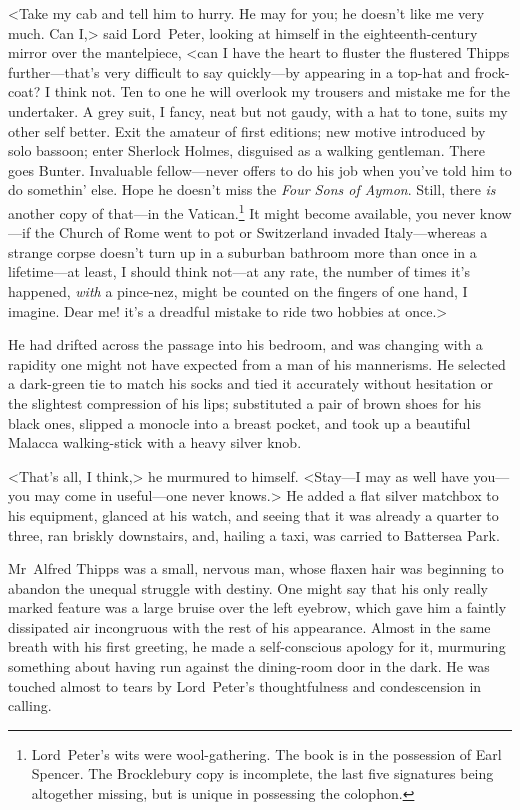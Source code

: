 <Take my cab and tell him to hurry. He may for you; he doesn't like me very much. Can I\@,> said Lord~Peter, looking at himself in the eighteenth-century mirror over the mantelpiece, <can I have the heart to fluster the flustered Thipps further—that's very difficult to say quickly—by appearing in a top-hat and frock-coat? I think not. Ten to one he will overlook my trousers and mistake me for the undertaker. A grey suit, I fancy, neat but not gaudy, with a hat to tone, suits my other self better. Exit the amateur of first editions; new motive introduced by solo bassoon; enter Sherlock Holmes, disguised as a walking gentleman. There goes Bunter. Invaluable fellow—never offers to do his job when you've told him to do somethin' else. Hope he doesn't miss the \textit{Four Sons of Aymon}. Still, there \textit{is} another copy of that—in the Vatican.\footnote{Lord~Peter's wits were wool-gathering. The book is in the possession of Earl Spencer. The Brocklebury copy is incomplete, the last five signatures being altogether missing, but is unique in possessing the colophon.} It might become available, you never know—if the Church of Rome went to pot or Switzerland invaded Italy—whereas a strange corpse doesn't turn up in a suburban bathroom more than once in a lifetime—at least, I should think not—at any rate, the number of times it's happened, \textit{with} a pince-nez, might be counted on the fingers of one hand, I imagine. Dear me! it's a dreadful mistake to ride two hobbies at once.>

He had drifted across the passage into his bedroom, and was changing with a rapidity one might not have expected from a man of his mannerisms. He selected a dark-green tie to match his socks and tied it accurately without hesitation or the slightest compression of his lips; substituted a pair of brown shoes for his black ones, slipped a monocle into a breast pocket, and took up a beautiful Malacca walking-stick with a heavy silver knob.

<That's all, I think,> he murmured to himself. <Stay—I may as well have you—you may come in useful—one never knows.> He added a flat silver matchbox to his equipment, glanced at his watch, and seeing that it was already a quarter to three, ran briskly downstairs, and, hailing a taxi, was carried to Battersea Park.

Mr~Alfred Thipps was a small, nervous man, whose flaxen hair was beginning to abandon the unequal struggle with destiny. One might say that his only really marked feature was a large bruise over the left eyebrow, which gave him a faintly dissipated air incongruous with the rest of his appearance. Almost in the same breath with his first greeting, he made a self-conscious apology for it, murmuring something about having run against the dining-room door in the dark. He was touched almost to tears by Lord~Peter's thoughtfulness and condescension in calling.

